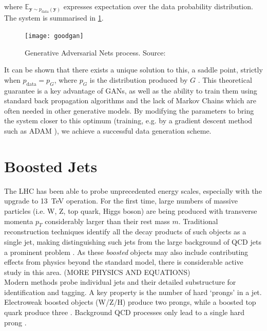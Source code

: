 \documentclass{report}
\begin{document}
where  $\mathbb{E}_{\mathbf{y}\sim p_{\text{data}}(\mathbf{y})}$ expresses expectation over the data probability distribution. The system is summarised in \cref{fig:gandiag}.  \\

\begin{figure}[H]
	\centering
	\texttt{[image: goodgan]}
	
	\caption{Generative Adversarial Nets process. Source: \cite{GoodfellowNips}}
	\label{fig:gandiag}
	
\end{figure}
It can be shown that there exists a unique solution to this, a saddle point, strictly when $p_{\text{data}} = p_G$, where $p_G$ is the distribution produced by $G$ \cite{gan1}. This theoretical guarantee is a key advantage of GANs, as well as the ability to train them using standard back propagation algorithms and the lack of Markov Chains which are often needed in other generative models. By modifying the parameters to bring the system closer to this optimum (training, e.g. by a gradient descent method such as ADAM \cite{adam}), we achieve a successful data generation scheme.    

\section{Boosted Jets}

The LHC has been able to probe unprecedented energy scales, especially with the upgrade to \SI{13}{\tera\electronvolt} operation. For the first time, large numbers of massive particles (i.e. W, Z, top quark, Higgs boson) are being produced with transverse momenta $p_T$ considerably larger than their rest mass $m$. Traditional reconstruction techniques identify all the decay products of such objects as a single jet, making distinguishing such jets from the large background of QCD jets a prominent problem \cite{BOOST}. As these \textit{boosted} objects may also include contributing effects from physics beyond the standard model, there is considerable active study in this area. (MORE PHYSICS AND EQUATIONS) \\

Modern methods probe individual jets and their detailed substructure for identification and tagging. A key property is the number of hard `prongs' in a jet. Electroweak boosted objects (W/Z/H) produce two prongs, while a boosted top quark produce three \cite{nsubjettiness}. Background QCD processes only lead to a single hard prong \cite{prongs}.\\
\end{document}
